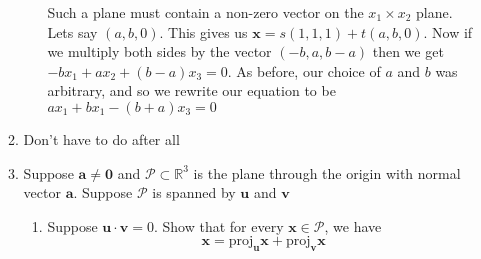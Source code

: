 \documentclass[letterpaper]{article}
\begin{document}
\begin{enumerate}
\begin{enumerate}
\begin{enumerate}
      Such a plane must contain a non-zero vector on the $x_1\times x_2$ plane. Lets say $(a,b,0)$. This gives us $\mathbf{x}=s(1,1,1)+t(a,b,0)$. Now if we multiply both sides by the vector $(-b,a,b-a)$ then we get $-bx_1+ax_2+(b-a)x_3=0$. As before, our choice of $a$ and $b$ was arbitrary, and so we rewrite our equation to be $ax_1+bx_1-(b+a)x_3=0$
    \end{enumerate}
  \item Don't have to do after all

%
  \item
    Suppose $\mathbf{a}\ne \mathbf{0}$ and $\mathcal{P}\subset \mathbb{R}^3$ is the plane through the origin with normal vector $\mathbf{a}$. Suppose $\mathcal{P}$ is spanned by $\mathbf{u}$ and $\mathbf{v}$
    \begin{enumerate}
    \item
      Suppose $\mathbf{u}\cdot\mathbf{v}=0$. Show that for every $\mathbf{x}\in \mathcal{P}$, we have
      \[\mathbf{x}=\text{proj}_{\mathbf{u}}\mathbf{x}+\text{proj}_{\mathbf{v}}\mathbf{x}\]


\end{enumerate}
\end{enumerate}
\end{enumerate}
\end{document}
